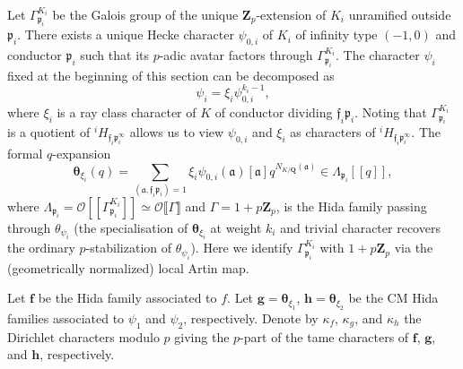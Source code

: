 \documentclass[10pt,letterpaper]{amsart}
\theoremstyle{plain}
\theoremstyle{definition}
\theoremstyle{definition}
\theoremstyle{plain}
\theoremstyle{plain}
\theoremstyle{plain}
\theoremstyle{remark}
\numberwithin{equation}{section}
\newcommand{\ch}{\xi}
\newcommand{\pp}{\mathfrak{p}}
\newcommand{\fkf}{\mathfrak{f}}
\def\cO{\mathcal O}
\newcommand{\Q}{\mathbf{Q}}
\newcommand{\Z}{\mathbf{Z}}
\newcommand{\dBr}[1]{\llbracket{#1}\rrbracket}
\newcommand{\bff}{{\boldsymbol{f}}}
\newcommand{\bfg}{{\boldsymbol{g}}}
\newcommand{\bfh}{{\boldsymbol{h}}}
\begin{document}
Let $\Gamma_{\pp_i}^{K_i}$ be the Galois group of the unique $\Z_p$-extension of $K_i$ unramified outside $\pp_i$. There exists a unique Hecke character $\psi_{0,i}$ of $K_i$ of infinity type $(-1,0)$ and conductor $\pp_i$ such that its $p$-adic avatar factors through $\Gamma_{\pp_i}^{K_i}$. The character $\psi_i$ fixed at the beginning of this section can be decomposed as 
\[
\psi_i=\ch_i {\psi_{0,i}^{k_i-1}},
\]
where $\ch_i$ is a ray class character of $K$ of conductor dividing $\fkf_i\pp_i$. Noting that $\Gamma_{\pp_i}^{K_i}$ is a quotient of $^iH_{\fkf_i\pp_i^\infty}$ allows us to view $\psi_{0,i}$ and $\ch_i$ as characters of $^iH_{\fkf_i\pp_i^\infty}$. The formal $q$-expansion
\[
\boldsymbol{\theta}_{\ch_i}(q)=\sum_{(\mathfrak{a},\fkf_i\pp_i)=1}\ch_i\psi_{0,i}(\mathfrak{a})[\mathfrak{a}]q^{N_{K/\Q}(\mathfrak{a})}\in\Lambda_{\pp_i}[\![q]\!],
\]
where $\Lambda_{\pp_i}=\cO[\![\Gamma_{\pp_i}^{K_i}]\!]\simeq\cO\dBr{\Gamma}$ and $\Gamma=1+p\Z_p$, is the Hida family passing through $\theta_{\psi_i}$ (the specialisation of $\boldsymbol{\theta}_{\ch_i}$ at weight $k_i$ and trivial character recovers the ordinary $p$-stabilization of $\theta_{\psi_i}$). Here we identify $\Gamma_{\pp_i}^{K_i}$ with $1+p\Z_p$ via the (geometrically normalized) local Artin map.

Let $\bff$ be the Hida family associated to $f$. Let $\bfg=\boldsymbol{\theta}_{\ch_1}$, $\bfh=\boldsymbol{\theta}_{\xi_2}$
be the CM Hida families associated to $\psi_1$ and $\psi_2$, respectively. Denote by $\kappa_f$,  $\kappa_g$, and $\kappa_h$ the Dirichlet characters modulo $p$ giving the $p$-part of the tame characters of $\bff$, $\bfg$, and $\bfh$, respectively. 
\end{document}
